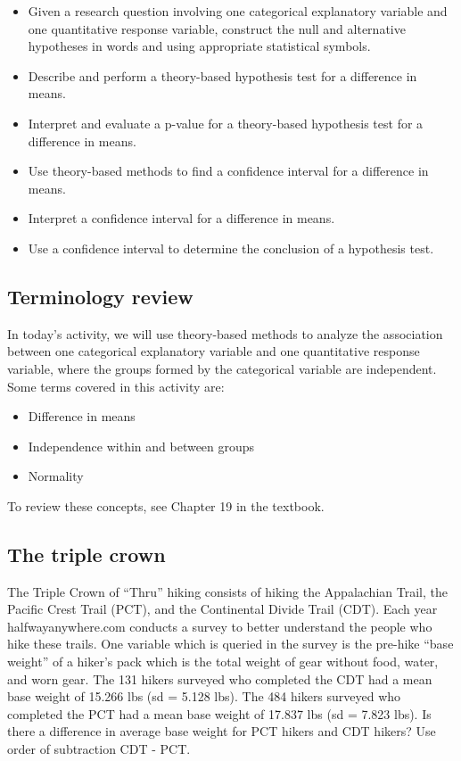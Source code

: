 \documentclass[
]{report}
\begin{document}
\begin{itemize}
\item
  Given a research question involving one categorical explanatory variable and one quantitative response variable, construct the null and alternative hypotheses
  in words and using appropriate statistical symbols.
\item
  Describe and perform a theory-based hypothesis test for a difference in means.
\item
  Interpret and evaluate a p-value for a theory-based hypothesis test for a difference in means.
\item
  Use theory-based methods to find a confidence interval for a difference in means.
\item
  Interpret a confidence interval for a difference in means.
\item
  Use a confidence interval to determine the conclusion of a hypothesis test.
\end{itemize}

\hypertarget{terminology-review-5}{%
\subsection{Terminology review}\label{terminology-review-5}}

In today's activity, we will use theory-based methods to analyze the association between one categorical explanatory variable and one quantitative response variable, where the groups formed by the categorical variable are independent. Some terms covered in this activity are:

\begin{itemize}
\item
  Difference in means
\item
  Independence within and between groups
\item
  Normality
\end{itemize}

To review these concepts, see Chapter 19 in the textbook.

\hypertarget{the-triple-crown}{%
\subsection{The triple crown}\label{the-triple-crown}}

The Triple Crown of ``Thru'' hiking consists of hiking the Appalachian Trail, the Pacific Crest Trail (PCT), and the Continental Divide Trail (CDT). Each year halfwayanywhere.com conducts a survey to better understand the people who hike these trails. One variable which is queried in the survey is the pre-hike ``base weight'' of a hiker's pack which is the total weight of gear without food, water, and worn gear. The 131 hikers surveyed who completed the CDT had a mean base weight of 15.266 lbs (sd = 5.128 lbs). The 484 hikers surveyed who completed the PCT had a mean base weight of 17.837 lbs (sd = 7.823 lbs). Is there a difference in average base weight for PCT hikers and CDT hikers? Use order of subtraction CDT - PCT.
\end{document}
